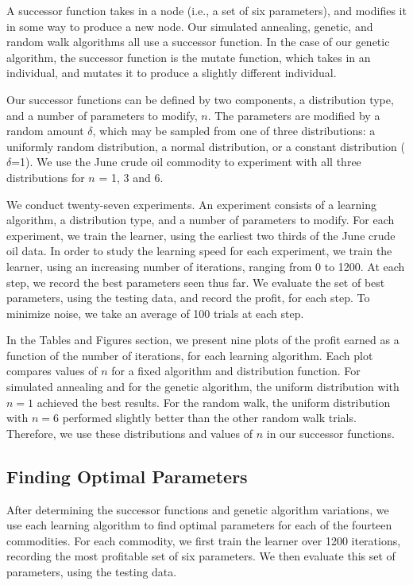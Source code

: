 \documentclass[12pt]{article}
\begin{document}
A successor function takes in a node (i.e., a set of six parameters), and
modifies it in some way to produce a new node.  Our simulated annealing,
genetic, and random walk algorithms all use a successor function.  In the case
of our genetic algorithm, the successor function is the mutate function, which
takes in an individual, and mutates it to produce a slightly different
individual.

Our successor functions can be defined by two components, a distribution type,
and a number of parameters to modify, $n$. The parameters are modified by a
random amount $\delta$, which may be sampled from one of three distributions: a
uniformly random distribution, a normal distribution, or a constant distribution
($\delta$=1). We use the June crude oil commodity to experiment with all three
distributions for $n$ = 1, 3 and 6.

We conduct twenty-seven experiments. An experiment consists of a learning
algorithm, a distribution type, and a number of parameters to modify. For each
experiment, we train the learner, using the earliest two thirds of the June
crude oil data. In order to study the learning speed for each experiment, we
train the learner, using an increasing number of iterations, ranging from 0 to
1200.  At each step, we record the best parameters seen thus far.  We evaluate
the set of best parameters, using the testing data, and record the profit, for
each step. To minimize noise, we take an average of 100 trials at each step.

In the Tables and Figures section, we present nine plots of the profit earned as
a function of the number of iterations, for each learning algorithm.  Each plot
compares values of $n$ for a fixed algorithm and distribution function.  For
simulated annealing and for the genetic algorithm, the uniform distribution with
$n = 1$ achieved the best results.  For the random walk, the uniform
distribution with $n = 6$ performed slightly better than the other random walk
trials.  Therefore, we use these distributions and values of $n$ in our
successor functions.

\subsection{Finding Optimal Parameters}

After determining the successor functions and genetic algorithm variations, we
use each learning algorithm to find optimal parameters for each of the fourteen
commodities. For each commodity, we first train the learner over 1200
iterations, recording the most profitable set of six parameters. We then
evaluate this set of parameters, using the testing data.
\end{document}
